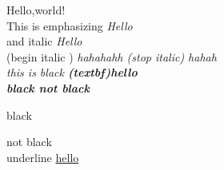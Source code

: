 \documentclass{article}
\begin{document}
Hello,world! \\

This is emphasizing \emph{Hello} \\

and italic \textit{Hello} \\ 

(begin italic ) \it hahahahh  (stop italic) \rm hahah \\


this is black \textbf{(textbf)hello} \\


\bfseries black \mdseries not black


\begin{bfseries} 
black
\end{bfseries}

not black \\

underline \underline{hello}
\end{document}

